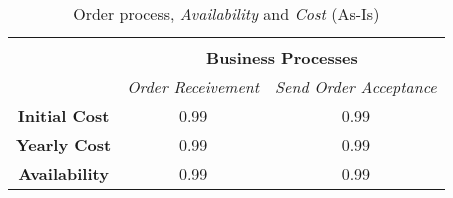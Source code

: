 \begin{table}[H]
\begin{tabular}{|c|c|p{2cm}|p{2.5cm}|p{2.5cm}|p{2.5cm}|}
		\multicolumn{6}{c}{} \\ \cline{3-6}
		\multicolumn{2}{c}{} & \multicolumn{4}{|c|}{\textbf{Business Processes}} \\ \cline{3-6}
		\multicolumn{2}{c|}{} & \multicolumn{2}{c|}{\textsl{Order Receivement}} & \multicolumn{2}{c|}{\textsl{Send Order Acceptance}} \\
		\hline
		\multicolumn{2}{|c|}{\textbf{Initial Cost}} & \multicolumn{2}{c|}{0.99} & \multicolumn{2}{c|}{0.99} \\ \hline
		\multicolumn{2}{|c|}{\textbf{Yearly Cost}}  & \multicolumn{2}{c|}{0.99} & \multicolumn{2}{c|}{0.99} \\ \hline
		\multicolumn{2}{|c|}{\textbf{Availability}}  & \multicolumn{2}{c|}{0.99} & \multicolumn{2}{c|}{0.99} \\ \hline
	\end{tabular}
\caption{Order process, \textsl{Availability} and \textsl{Cost} (As-Is)} 
\label{tab:order_as_is}
\end{table}